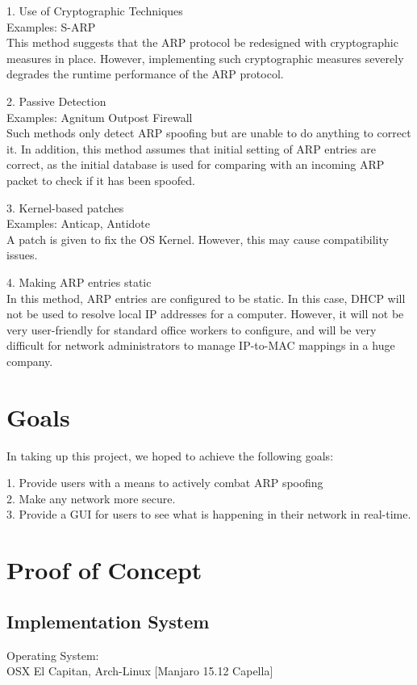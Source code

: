 \documentclass{acm_proc_article-sp}
\begin{document}
1. Use of Cryptographic Techniques \\
Examples: S-ARP \\
This method suggests that the ARP protocol be redesigned with cryptographic measures in place. However, implementing such cryptographic measures severely degrades the runtime performance of the ARP protocol. 

2. Passive Detection \\
Examples: Agnitum Outpost Firewall\\
Such methods only detect ARP spoofing but are unable to do anything to correct it. In addition, this method assumes that initial setting of ARP entries are correct, as the initial database is used for comparing with an incoming ARP packet to check if it has been spoofed. 

3. Kernel-based patches\\
Examples: Anticap, Antidote \\
A patch is given to fix the OS Kernel. However, this may cause compatibility issues. 

4. Making ARP entries static\\ 
In this method, ARP entries are configured to be static. In this case, DHCP will not be used to resolve local IP addresses for a computer. However, it will not be very user-friendly for standard office workers to configure, and will be very difficult for network administrators to manage IP-to-MAC mappings in a huge company. 


\section{Goals}
In taking up this project, we hoped to achieve the following goals: 

1. Provide users with a means to actively combat ARP spoofing \\
2. Make any network more secure. \\
3. Provide a GUI for users to see what is happening in their network in real-time. 

\section{Proof of Concept}
\subsection{Implementation System}
Operating System: \\
OSX El Capitan, Arch-Linux [Manjaro 15.12 Capella]
\end{document}
